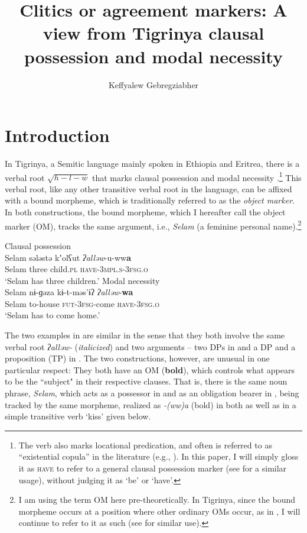 \documentclass[output=paper]{langscibook}
\author{Keffyalew Gebregziabher\affiliation{University of Toronto}}
\title[Clitics or agreement markers]
      {Clitics or agreement markers: A view from Tigrinya clausal possession and modal necessity}
\begin{document}
\maketitle

\section{Introduction}
In Tigrinya, a Semitic language mainly spoken in Ethiopia and Eritrea, there is a verbal root $\sqrt{h-l-w}$ that marks clausal possession  and modal necessity .\footnote{The verb also marks locational predication, and often is referred to as ``existential copula'' in the literature (e.g., \citealt{hetzron1972}). In this paper, I will simply gloss it as {\scshape have} to refer to a general clausal possession marker (see \citealt{myler16} for a similar usage), without judging it as `be' or `have'.} This verbal root, like any other transitive verbal root in the language, can be affixed with a bound morpheme, which is traditionally referred to as the \emph{object marker}. In both constructions, the bound morpheme, which I hereafter call the object marker (OM), tracks the same argument, i.e., \emph{Selam} (a feminine personal name).\footnote{I am using the term OM here pre-theoretically. In Tigrinya, since the bound morpheme occurs at a position where other ordinary OMs occur, as in , I will continue to refer to it as such (see \citealt{kramer14} for similar use).}

\ea\label{ex:Gebregziabher:clause}
\ea\label{ex:Gebregziabher:ClP} Clausal possession \\
\gll Selam sələstə kʼolʕut \textit{ʔalləw}-u-ww\textbf{a} \\
Selam three child.{\scshape pl} {\scshape have-3mpl.s-3fsg.o}\\
\glt `Selam has three children.'
\ex\label{ex:Gebregziabher:MoN}  Modal necessity \\
\gll Selam nɨ-ɡəza kɨ-t-məs'ɨʔ \textit{ʔalləw}-{\textbf{wa}} \\
Selam to-house {\scshape fut-3fsg}-come {\scshape have-3fsg.o}\\
\glt `Selam has to come home.'
\z
\z

\noindent The two examples in  are similar in the sense that they both involve the same verbal root \emph{ʔalləw-} (\textit{italicized}) and two arguments -- two DPs in  and a DP and a proposition (TP) in . The two constructions, however, are unusual in one particular respect: They both have an OM ({\textbf{bold}}), which controls what appears to be the ``subject" in their respective clauses. That is, there is the same noun phrase, \emph{Selam}, which acts as a possessor in  and as an obligation bearer in , being tracked by the same morpheme, realized as \emph{-(ww)a} (bold) in both as well as in a simple transitive verb `kiss' given below.
\end{document}

